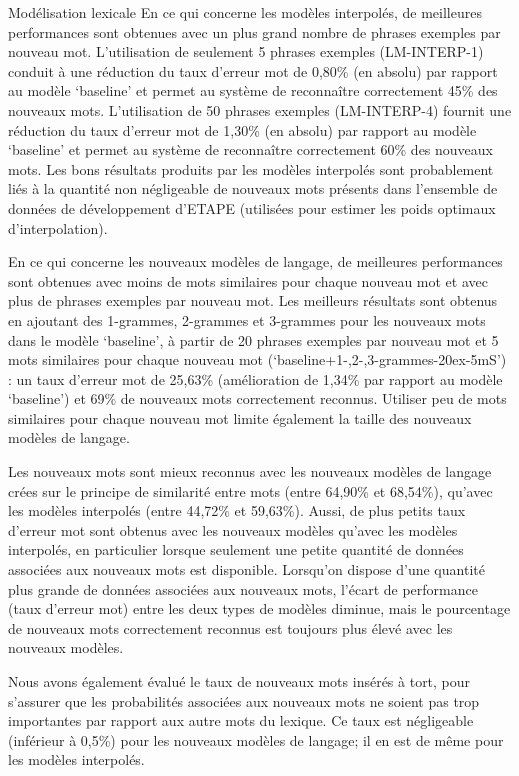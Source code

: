\documentclass{style/these}
\begin{document}
\begin{part}{Modélisation lexicale}
En ce qui concerne les modèles interpolés, de meilleures performances sont obtenues avec un plus grand nombre de phrases exemples par nouveau mot. 
L'utilisation de seulement 5 phrases exemples (LM-INTERP-1) conduit à une réduction du taux d'erreur mot de 0,80\% (en absolu) par rapport au modèle `baseline' et permet au système de reconnaître correctement 45\% des nouveaux mots. 
L'utilisation de 50 phrases exemples (LM-INTERP-4) fournit une réduction du taux d'erreur mot de 1,30\% (en absolu) par rapport au modèle `baseline' et permet au système de reconnaître correctement 60\% des nouveaux mots. 
Les bons résultats produits par les modèles interpolés sont probablement liés à la quantité non négligeable de nouveaux mots présents dans l'ensemble de données de développement d'ETAPE (utilisées pour estimer les poids optimaux d'interpolation).

En ce qui concerne les nouveaux modèles de langage, de meilleures performances sont obtenues avec moins de mots similaires pour chaque nouveau mot et avec plus de phrases exemples par nouveau mot. Les meilleurs résultats sont obtenus en ajoutant des 1-grammes, 2-grammes et 3-grammes pour les nouveaux mots dans le modèle `baseline', à partir de 20 phrases exemples par nouveau mot et 5 mots similaires pour chaque nouveau mot (`baseline+1-,2-,3-grammes-20ex-5mS') : un taux d'erreur mot de 25,63\% (amélioration de 1,34\% par rapport au modèle `baseline') et 69\% de nouveaux mots correctement reconnus. 
Utiliser peu de mots similaires pour chaque nouveau mot limite également la taille des nouveaux modèles de langage.

Les nouveaux mots sont mieux reconnus avec les nouveaux modèles de langage crées sur le principe de similarité entre mots (entre 64,90\% et 68,54\%), qu'avec les modèles interpolés (entre 44,72\% et 59,63\%). 
Aussi, de plus petits taux d'erreur mot sont obtenus avec les nouveaux modèles qu'avec les modèles interpolés, en particulier lorsque seulement une petite quantité de données associées aux nouveaux mots est disponible. Lorsqu'on dispose d'une quantité plus grande de données associées aux nouveaux mots, l'écart de performance (taux d'erreur mot) entre les deux types de modèles diminue, mais le pourcentage de nouveaux mots correctement reconnus est toujours plus élevé avec les nouveaux modèles.

Nous avons également évalué le taux de nouveaux mots insérés à tort, pour s'assurer que les probabilités associées aux nouveaux mots ne soient pas trop importantes par rapport aux autre mots du lexique. Ce taux est négligeable (inférieur à 0,5\%) pour les nouveaux modèles de langage; il en est de même pour les modèles interpolés. 


\end{part}
\end{document}
